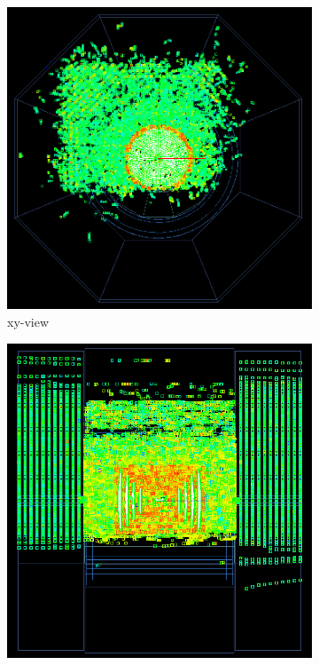 \begin{figure}
    \centering
    \begin{subfigure}[b]{0.49\textwidth}
    \centering
        \includegraphics[height=0.3\textheight]{figures/muons_positron_5spoilers_2961_xyview_croped.png}
        \caption{xy-view}
	\label{fig:xy_5SpoilersWall}
    \end{subfigure}
    \begin{subfigure}[b]{0.49\textwidth}
    \centering
        \includegraphics[height=0.3\textheight]{figures/muons_positron_5spoilers_2961_zyview_croped.png}

\end{subfigure}
\end{figure}
